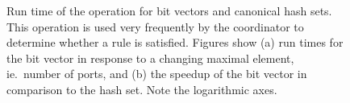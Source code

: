 \begin{figure}
	\centering
	\caption[Bit vector speedup over hashset.]{Run time of the  operation for bit vectors and canonical hash sets. This operation is used very frequently by the coordinator to determine whether a rule is satisfied. Figures show (a) run times for the bit vector in response to a changing maximal element, ie.\ number of ports, and (b) the speedup of the bit vector in comparison to the hash set. Note the logarithmic axes.}
	\label{fig:bits}
\end{figure}



